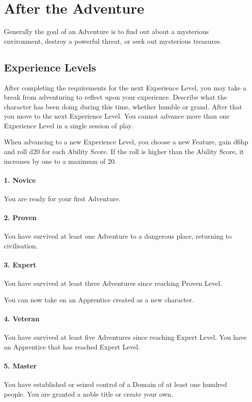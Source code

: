 \documentclass[itdr]{subfiles}
\begin{document}
\vfill
\break

\section{After the Adventure}

Generally the goal of an Adventure is to find out about a mysterious environment, destroy a powerful threat, or seek out mysterious treasures.

\subsection{Experience Levels}
After completing the requirements for the next Experience Level, you may take a break from adventuring to reflect upon your experience. Describe what the character has been doing during this time, whether humble or grand. After that you move to the next Experience Level. You cannot advance more than one Experience Level in a single session of play.

When advancing to a new Experience Level, you choose a new Feature, gain d6hp and roll d20 for each Ability Score. If the roll is higher than the Ability Score, it increases by one to a maximum of 20.

\paragraph{1. Novice}
You are ready for your first Adventure.

\paragraph{2. Proven}
You have survived at least one Adventure to a dangerous place, returning to civilisation.

\paragraph{3. Expert}
You have survived at least three Adventures since reaching Proven Level.

You can now take on an Apprentice created as a new character.

\paragraph{4. Veteran}
You have survived at least five Adventures since reaching Expert Level. You have an Apprentice that has reached Expert Level.

\paragraph{5. Master}
You have established or seized control of a Domain of at least one hundred people. You are granted a noble title or create your own.
\end{document}
